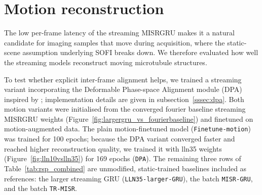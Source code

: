 








\section{Motion reconstruction}
\label{sec:alignment_ablation}
The low per-frame latency of the streaming MISRGRU makes it a natural
candidate for imaging samples that move during acquisition, where the static-scene
assumption underlying SOFI breaks down. We therefore evaluated how well the streaming
models reconstruct moving microtubule structures.

To test whether explicit inter-frame alignment helps, we trained a streaming variant
incorporating the Deformable Phase-space Alignment module (DPA) inspired by
\cite{qiao2025dpatisr}; implementation details are given in subsection~\ref{sssec:dpa}.
Both motion variants were initialised from the converged fourier baseline streaming MISRGRU weights
(Figure~\ref{fig:largergru_vs_fourierbaseline}) and finetuned on motion-augmented data.
The plain motion-finetuned model (\texttt{Finetune-motion}) was trained for 100 epochs;
because the DPA variant converged faster and reached higher reconstruction quality, we
trained it with lln35 weights (Figure~\ref{fig:lln10vslln35}) for 169 epochs
(\texttt{DPA}). 
The remaining three rows of Table~\ref{tab:rsp_combined} are 
unmodified, static-trained baselines included as
references: the larger streaming GRU (\texttt{LLN35-larger-GRU}), the batch
\texttt{MISR-GRU}, and the batch \texttt{TR-MISR}.

